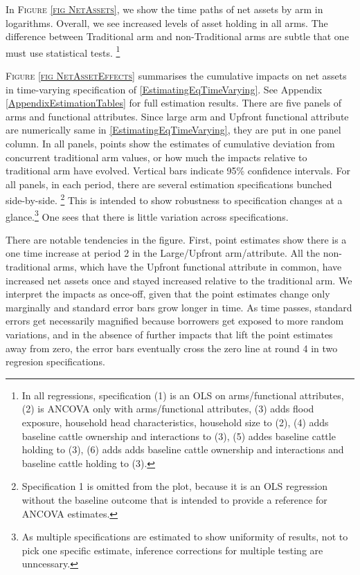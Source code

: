 	In \textsc{\footnotesize Figure \ref{fig NetAssets}}, we show the time paths of net assets by arm in logarithms. Overall, we see increased levels of asset holding in all arms. The difference between \textsf{Traditional} arm and non-\textsf{Traditional} arms are subtle that one must use statistical tests. \footnote{In all regressions, specification (1) is an OLS on arms/functional attributes, (2) is ANCOVA only with arms/functional attributes, (3) adds flood exposure, household head characteristics, household size to (2), (4) adds baseline cattle ownership and interactions to (3), (5) addes baseline cattle holding to (3), (6) adds adds baseline cattle ownership and interactions and baseline cattle holding to (3). } 

	\textsc{\footnotesize Figure \ref{fig NetAssetEffects}} summarises the cumulative impacts on net assets in time-varying specification of \eqref{EstimatingEqTimeVarying}.  See Appendix \ref{AppendixEstimationTables} for full estimation results. There are five panels of arms and functional attributes. Since \textsf{large} arm and \textsf{Upfront} functional attribute are numerically same in \eqref{EstimatingEqTimeVarying}, they are put in one panel column. In all panels, points show the estimates of cumulative deviation from concurrent \textsf{traditional} arm values, or how much the impacts relative to \textsf{traditional} arm have evolved. Vertical bars indicate 95\% confidence intervals. 
	For all panels, in each period, there are several estimation specifications bunched side-by-side. \footnote{Specification 1 is omitted from the plot, because it is an OLS regression without the baseline outcome that is intended to provide a reference for ANCOVA estimates. } This is intended to show robustness to specification changes at a glance.\footnote{As multiple specifications are estimated to show uniformity of results, not to pick one specific estimate, inference corrections for multiple testing are unncessary. } One sees that there is little variation across specifications. %
	
	There are notable tendencies in the figure. First, point estimates show there is a one time increase at period 2 in the \textsf{Large/Upfront} arm/attribute. %
	All the non-\textsf{traditional} arms, which have the \textsf{Upfront} functional attribute in common, have increased net assets once and stayed increased relative to the \textsf{traditional} arm. We interpret the impacts as once-off, given that the point estimates change only marginally and standard error bars grow longer in time. As time passes, standard errors get necessarily magnified because borrowers get exposed to more random variations, and in the absence of further impacts that lift the point estimates away from zero, the error bars eventually cross the zero line at round 4 in two regresion specifications. %

